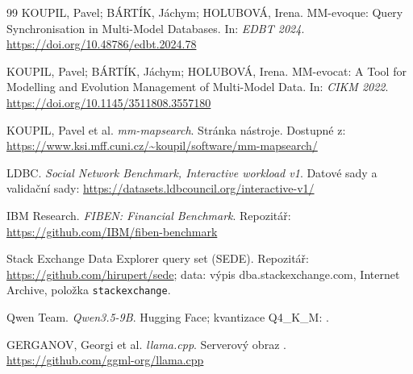 \documentclass{article}
\begin{document}
\begin{thebibliography}{99}
KOUPIL, Pavel; BÁRTÍK, Jáchym; HOLUBOVÁ, Irena. MM-evoque: Query Synchronisation in Multi-Model Databases. In: \emph{EDBT 2024}. \url{https://doi.org/10.48786/edbt.2024.78}

KOUPIL, Pavel; BÁRTÍK, Jáchym; HOLUBOVÁ, Irena. MM-evocat: A Tool for Modelling and Evolution Management of Multi-Model Data. In: \emph{CIKM 2022}. \url{https://doi.org/10.1145/3511808.3557180}

KOUPIL, Pavel et al. \emph{mm-mapsearch}. Stránka nástroje. Dostupné z: \url{https://www.ksi.mff.cuni.cz/~koupil/software/mm-mapsearch/}

LDBC. \emph{Social Network Benchmark, Interactive workload v1}. Datové sady a validační sady: \url{https://datasets.ldbcouncil.org/interactive-v1/}

IBM Research. \emph{FIBEN: Financial Benchmark}. Repozitář: \url{https://github.com/IBM/fiben-benchmark}

Stack Exchange Data Explorer query set (SEDE). Repozitář: \url{https://github.com/hirupert/sede}; data: výpis dba.stackexchange.com, Internet Archive, položka \texttt{stackexchange}.

Qwen Team. \emph{Qwen3.5-9B}. Hugging Face; kvantizace Q4\_K\_M: .

GERGANOV, Georgi et al. \emph{llama.cpp}. Serverový obraz . \url{https://github.com/ggml-org/llama.cpp}

\end{thebibliography}
\end{document}
